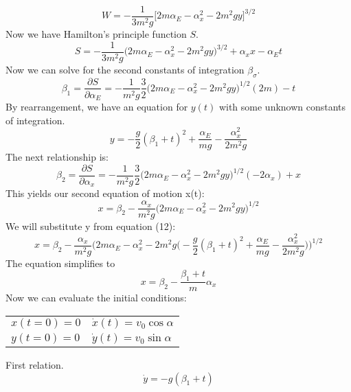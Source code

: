 \documentclass[11pt,a4paper]{report}
\begin{document}
\begin{equation}
W = -\dfrac{1}{3m^2g}\Big[2m\alpha_E-\alpha_x^2 -2m^2gy \Big]^{3/2}
\end{equation}
Now we have Hamilton's principle function $S$.
\begin{equation}
S = -\dfrac{1}{3m^2g}\Big(2m\alpha_E - \alpha_x^2 - 2m^2gy\Big)^{3/2}+\alpha_xx-\alpha_Et
\end{equation}
Now we can solve for the second constants of integration $\beta_\sigma$.
\begin{equation}
\beta_1 = \dfrac{\partial S}{\partial \alpha_E}=-\dfrac{1}{m^2g}\dfrac{3}{2}\Big(2m\alpha_E-\alpha_x^2-2m^2gy\Big)^{1/2}(2m)-t
\end{equation}
By rearrangement, we have an equation for $y(t)$ with some unknown constants of integration.
\begin{equation}
y = -\dfrac{g}{2}(\beta_1+t)^2+\dfrac{\alpha_E}{mg}-\dfrac{\alpha_x^2}{2m^2g}
\end{equation}
The next relationship is:
\begin{equation}
\beta_2 = \dfrac{\partial S}{\partial \alpha_x} =-\dfrac{1}{m^2g}\dfrac{3}{2}\Big(2m\alpha_E-\alpha_x^2-2m^2gy\Big)^{1/2}(-2\alpha_x)+x 
\end{equation}
This yields our second equation of motion x(t):
\begin{equation}
x = \beta_2 - \dfrac{\alpha_x}{m^2g}\Big(2m\alpha_E-\alpha_x^2-2m^2gy \Big)^{1/2}
\end{equation}
We will substitute y from equation (12):
\begin{equation}
x = \beta_2 - \dfrac{\alpha_x}{m^2g}\Big(2m\alpha_E-\alpha_x^2-2m^2g\Big(-\dfrac{g}{2}(\beta_1+t)^2+\dfrac{\alpha_E}{mg}-\dfrac{\alpha_x^2}{2m^2g}\Big) \Big)^{1/2}
\end{equation}
The equation simplifies to
\begin{equation}
x = \beta_2-\dfrac{\beta_1+t}{m}\alpha_x
\end{equation}
Now we can evaluate the initial conditions:
\begin{center}
\begin{tabular}{l l}
$x(t=0) = 0$ & $\dot{x}(t) = v_0 \cos{\alpha}$ \\
$y(t=0) = 0$ & $\dot{y}(t) = v_0 \sin{\alpha}$ \\
\end{tabular}
\end{center}
\vspace{5mm}
First relation.
\begin{equation}
\dot{y} = -g(\beta_1+t)
\end{equation}
\end{document}
